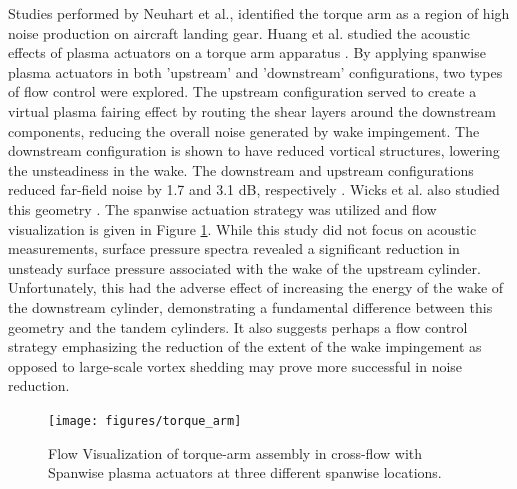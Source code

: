 Studies performed by Neuhart et al., identified the torque arm as a region of high noise production on aircraft landing gear. 
Huang et al. studied the acoustic effects of plasma actuators on a torque arm apparatus \cite{huang2010}. By applying spanwise plasma actuators in both 'upstream' and 'downstream' configurations, two types of flow control were explored. The upstream configuration served to create a virtual plasma fairing effect by routing the shear layers around the downstream components, reducing the overall noise generated by wake impingement. The downstream configuration is shown to have reduced vortical structures, lowering the unsteadiness in the wake. The downstream and upstream configurations reduced far-field noise by 1.7 and 3.1 dB, respectively \cite{huang2010}.
Wicks et al. also studied this geometry \cite{wicks2015}. The spanwise actuation strategy was utilized and flow visualization is given in Figure \ref{fig:cyl2}. While this study did not focus on acoustic measurements, surface pressure spectra revealed a significant reduction in unsteady surface pressure associated with the wake of the upstream cylinder. Unfortunately, this had the adverse effect of increasing the energy of the wake of the downstream cylinder, demonstrating a fundamental difference between this geometry and the tandem cylinders. It also suggests perhaps a flow control strategy emphasizing the reduction of the extent of the wake impingement as opposed to large-scale vortex shedding may prove more successful in noise reduction.

\begin{figure}
	\begin{center}
		\centerline{\texttt{[image: figures/torque\_arm]}}
		\caption{Flow Visualization of torque-arm assembly in cross-flow with Spanwise plasma actuators at three different spanwise locations.}
		\label{fig:cyl2}
	\end{center}
\end{figure}


